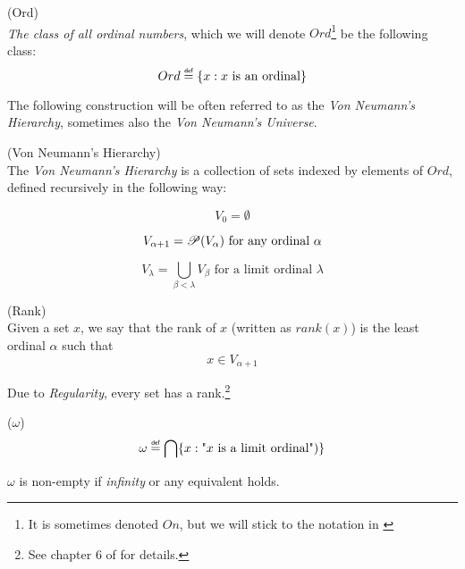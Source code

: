 \begin{definition}{(Ord)}\label{def:ord}\\
\emph{The class of all ordinal numbers}, which we will denote $Ord$\footnote{It is sometimes denoted $On$, but we will stick to the notation in \cite{JechBook}} be the following class:
\begin{equation}
Ord \defeq \{x : x\mbox{ is an ordinal}\}
\end{equation}
\end{definition}

The following construction will be often referred to as the \emph{Von Neumann's Hierarchy}, sometimes also the \emph{Von Neumann's Universe}. %

\begin{definition}{(Von Neumann's Hierarchy)}\label{def:von_neumann}\\
The \emph{Von Neumann's Hierarchy} is a collection of sets indexed by elements of $Ord$, defined recursively in the following way:
\bce[(i)]
\item 
\begin{equation}
V_0 = \emptyset
\end{equation}
\item 
\begin{equation}
V_{\alpha+1} = \mathscr{P} (V_\alpha)\mbox{ for any ordinal $\alpha$}
\end{equation}
\item
\begin{equation} 
V_\lambda = \bigcup_{\beta < \lambda} V_\beta \mbox{ for a limit ordinal $\lambda$}
\end{equation}
\ece
\end{definition}

\begin{definition}{(Rank)}\label{def:rank}\\
Given a set $x$, we say that the rank of $x$ (written as $rank(x)$) is the least ordinal $\alpha$ such that
\begin{equation}
x \in V_{\alpha+1}
\end{equation}
\end{definition}
Due to \emph{Regularity}, every set has a rank.\footnote{See chapter 6 of \cite{JechBook} for details.}

\begin{definition}{($\omega$)}\\
\begin{equation}
\omega \defeq \bigcap\{x : \mbox{"$x$ is a limit ordinal"})\}
\end{equation}
\end{definition}
$\omega$ is non-empty if \emph{infinity} or any equivalent holds.

